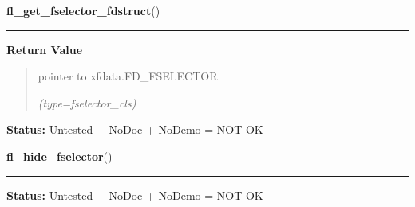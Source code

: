     \vspace{0.5ex}

\hspace{.8\funcindent}\begin{boxedminipage}{\funcwidth}

    \raggedright \textbf{fl\_get\_fselector\_fdstruct}()

    \vspace{-1.5ex}

    \rule{\textwidth}{0.5\fboxrule}
\setlength{\parskip}{2ex}
\setlength{\parskip}{1ex}
      \textbf{Return Value}
    \vspace{-1ex}

      \begin{quote}
      pointer to xfdata.FD\_FSELECTOR

      {\it (type=fselector\_cls)}

      \end{quote}

\textbf{Status:} Untested + NoDoc + NoDemo = NOT OK



    \end{boxedminipage}

    \label{xformslib:library:fl_hide_fselector}

    \vspace{0.5ex}

\hspace{.8\funcindent}\begin{boxedminipage}{\funcwidth}

    \raggedright \textbf{fl\_hide\_fselector}()

    \vspace{-1.5ex}

    \rule{\textwidth}{0.5\fboxrule}
\setlength{\parskip}{2ex}
\setlength{\parskip}{1ex}
\textbf{Status:} Untested + NoDoc + NoDemo = NOT OK



    \end{boxedminipage}

    \label{xformslib:library:fl_set_fselector_filetype_marker}

    \vspace{0.5ex}

